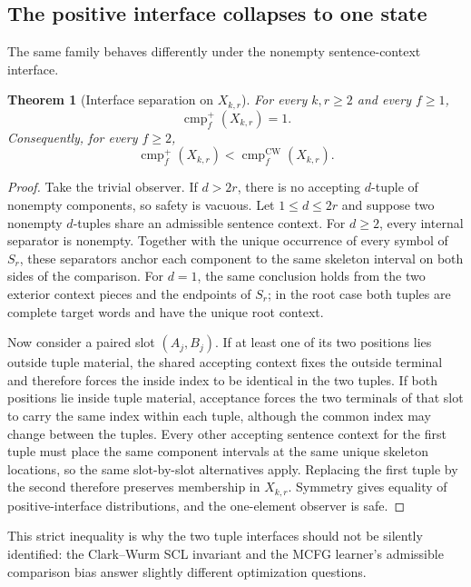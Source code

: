 \documentclass[11pt]{article}
\newtheorem{theorem}{Theorem}[section]
\theoremstyle{definition}
\theoremstyle{remark}
\newcommand{\cmp}{\operatorname{cmp}}
\begin{document}
\subsection{The positive interface collapses to one state}

The same family behaves differently under the nonempty sentence-context
interface.

\begin{theorem}[Interface separation on $X_{k,r}$]
\label{thm:X-interface}
For every $k,r\ge2$ and every $f\ge1$,
\[
 \boxed{\cmp_f^+(X_{k,r})=1.}
\]
Consequently, for every $f\ge2$,
\[
 \boxed{
 \cmp_f^+(X_{k,r})
 <
 \cmp_f^{\mathrm{CW}}(X_{k,r}).
 }
\]
\end{theorem}

\begin{proof}
Take the trivial observer.  If $d>2r$, there is no accepting $d$-tuple of
nonempty components, so safety is vacuous.  Let $1\le d\le2r$ and suppose two
nonempty $d$-tuples share an admissible sentence context.  For $d\ge2$, every
internal separator is nonempty.  Together with the unique occurrence of every
symbol of $S_r$, these separators anchor each component to the same skeleton
interval on both sides of the comparison.  For $d=1$, the same conclusion
holds from the two exterior context pieces and the endpoints of $S_r$; in the
root case both tuples are complete target words and have the unique root
context.

Now consider a paired slot $(A_j,B_j)$.  If at least one of its two positions
lies outside tuple material, the shared accepting context fixes the outside
terminal and therefore forces the inside index to be identical in the two
tuples.  If both positions lie inside tuple material, acceptance forces the two
terminals of that slot to carry the same index within each tuple, although the
common index may change between the tuples.  Every other accepting sentence
context for the first tuple must place the same component intervals at the same
unique skeleton locations, so the same slot-by-slot alternatives apply.
Replacing the first tuple by the second therefore preserves membership in
$X_{k,r}$.  Symmetry gives equality of positive-interface distributions, and
the one-element observer is safe.
\end{proof}

This strict inequality is why the two tuple interfaces should not be silently
identified: the Clark--Wurm SCL invariant and the MCFG learner's admissible
comparison bias answer slightly different optimization questions.
\end{document}
